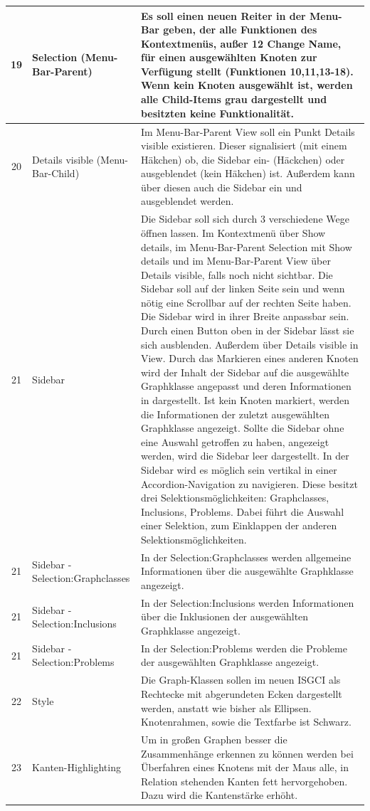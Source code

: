 \documentclass[10pt,a4paper]{article}
\begin{document}
\begin{tabular}{|c|p{5cm}|p{8cm}|}
\hline 
19 & Selection (Menu-Bar-Parent) & Es soll einen neuen Reiter in der Menu-Bar geben, der alle Funktionen des Kontextmenüs, außer 12 Change Name, für einen ausgewählten Knoten zur Verfügung stellt (Funktionen 10,11,13-18). Wenn kein Knoten ausgewählt ist, werden alle Child-Items grau dargestellt und besitzten keine Funktionalität.  \\
\hline
20 & Details visible (Menu-Bar-Child) & Im Menu-Bar-Parent View soll ein Punkt Details visible existieren. Dieser signalisiert (mit einem Häkchen) ob, die Sidebar ein- (Häckchen) oder ausgeblendet (kein Häkchen) ist. Außerdem kann über diesen auch die Sidebar ein und ausgeblendet werden.\\ 
\hline
21 & Sidebar & Die Sidebar soll sich durch 3 verschiedene Wege öffnen lassen. Im Kontextmenü über Show details, im Menu-Bar-Parent Selection mit Show details und im Menu-Bar-Parent View über Details visible, falls noch nicht sichtbar. Die Sidebar soll auf der linken Seite sein und wenn nötig eine Scrollbar auf der rechten Seite haben. Die Sidebar wird in ihrer Breite anpassbar sein. Durch einen Button oben in der Sidebar lässt sie sich ausblenden. Außerdem über Details visible in View. Durch das Markieren eines anderen Knoten wird der Inhalt der Sidebar auf die ausgewählte Graphklasse angepasst und deren Informationen in dargestellt. Ist kein Knoten markiert, werden die Informationen der zuletzt ausgewählten Graphklasse angezeigt. Sollte die Sidebar ohne eine Auswahl getroffen zu haben, angezeigt werden, wird die Sidebar leer dargestellt. In der Sidebar wird es möglich sein vertikal in einer Accordion-Navigation zu navigieren. Diese besitzt drei Selektionsmöglichkeiten: Graphclasses, Inclusions, Problems. Dabei führt die Auswahl einer Selektion, zum Einklappen der anderen Selektionsmöglichkeiten. \\
\hline
21 & Sidebar - Selection:Graphclasses  & In der Selection:Graphclasses werden allgemeine Informationen über die ausgewählte Graphklasse angezeigt. \\
\hline
21 & Sidebar - Selection:Inclusions & In der Selection:Inclusions werden Informationen über die Inklusionen der ausgewählten Graphklasse angezeigt. \\
\hline
21 & Sidebar - Selection:Problems & In der Selection:Problems werden die Probleme der ausgewählten Graphklasse angezeigt. \\
\hline
22 & Style & Die Graph-Klassen sollen im neuen ISGCI als Rechtecke mit abgerundeten Ecken dargestellt werden, anstatt wie bisher als Ellipsen. Knotenrahmen, sowie die Textfarbe ist Schwarz.\\
\hline
23 & Kanten-Highlighting & Um in großen Graphen besser die Zusammenhänge erkennen zu können werden bei Überfahren eines Knotens mit der Maus alle, in Relation stehenden Kanten fett hervorgehoben. Dazu wird die Kantenstärke erhöht.\\
\hline
\end{tabular} \newpage
\end{document}
